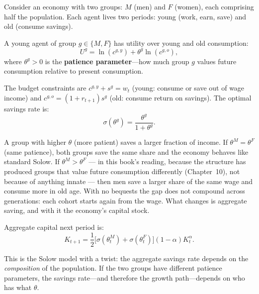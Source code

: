 \documentclass[../structural_economics_book.tex]{subfiles}
\begin{document}
\begin{example}\label{ch03:ex:two_group}
Consider an economy with two groups: $M$ (men) and $F$ (women), each comprising half the population. Each agent lives two periods: young (work, earn, save) and old (consume savings).

A young agent of group $g \in \{M, F\}$ has utility over young and old consumption:
\begin{equation}\label{ch03:eq:OLG_utility}
U^g = \ln(c^{g,y}) + \theta^g \ln(c^{g,o}),
\end{equation}
where $\theta^g > 0$ is the \textbf{patience parameter}---how much group $g$ values future consumption relative to present consumption.

The budget constraints are $c^{g,y} + s^g = w_t$ (young: consume or save out of wage income) and $c^{g,o} = (1 + r_{t+1})s^g$ (old: consume return on savings). The optimal savings rate is:
\begin{equation}\label{ch03:eq:savings_rate}
\sigma(\theta^g) = \frac{\theta^g}{1 + \theta^g}.
\end{equation}

A group with higher $\theta$ (more patient) saves a larger fraction of income. If $\theta^M = \theta^F$ (same patience), both groups save the same share and the economy behaves like standard Solow. If $\theta^M > \theta^F$ --- in this book's reading, because the structure has produced groups that value future consumption differently (Chapter~10), not because of anything innate --- then men save a larger share of the same wage and consume more in old age. With no bequests the gap does not compound across generations: each cohort starts again from the wage. What changes is aggregate saving, and with it the economy's capital stock.
\end{example}

Aggregate capital next period is:
\begin{equation}\label{ch03:eq:K_OLG}
K_{t+1} = \frac{1}{2}\bigl[\sigma(\theta^M_t) + \sigma(\theta^F_t)\bigr](1-\alpha)K_t^\alpha.
\end{equation}

This is the Solow model with a twist: the aggregate savings rate depends on the \textit{composition} of the population. If the two groups have different patience parameters, the savings rate---and therefore the growth path---depends on who has what $\theta$.
\end{document}
